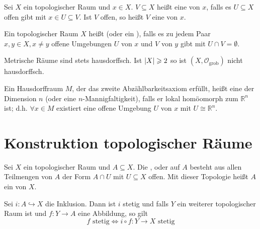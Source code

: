 \begin{definition}[{name=[Umgebung]}]
	Sei $X$ ein topologischer Raum und $x \in X$. 
	$V \subseteq X$ heißt eine  von $x$, falls es $U \subseteq X$ offen gibt mit $x \in U \subseteq V$. 
	Ist $V$ offen, so heißt $V$ eine  von $x$.
\end{definition}

\begin{definition}[{name=[Hausdorffraum]}]
	Ein topologischer Raum $X$ heißt  (oder ein ), falls es zu jedem Paar $x,y \in X, x \neq y$ offene Umgebungen $U$ von $x$ und $V$ von $y$ gibt mit $U \cap V = \emptyset$.
\end{definition}

Metrische Räume sind stets hausdorffsch.
Ist $\abs*{X} \ge 2 $ so ist $(X, \mathcal{O}_{\text{grob}})$ nicht hausdorffsch.

\begin{definition}[{name=[topologische Mannigfaltigkeit]}]
	Ein Hausdorffraum $M$, der das zweite Abzählbarkeitsaxiom erfüllt, heißt eine  der Dimension $n$ (oder eine $n$-Mannigfaltigkeit), falls er lokal homöomorph zum $\mathbb{R}^n$ ist; d.h. $\forall x \in M$ existiert eine offene Umgebung $U$ von $x$ mit $U \cong \mathbb{R}^n$.
\end{definition}

\newpage

\section{Konstruktion topologischer Räume} %
\label{sec:konst_topo}

\begin{definition}[{name=[Teilraumtopologie]}]
	Sei $X$ ein topologischer Raum und $A \subseteq X$.
	Die ,  oder  auf $A$ besteht aus allen Teilmengen von $A$ der Form $A \cap U$ mit $U \subseteq X$ offen. 
	Mit dieser Topologie heißt $A$ ein  von $X$.
\end{definition}

\begin{bemerkung}[{name=[Eigenschaften der Inklusion]}]
	Sei $i \colon A \hookrightarrow X$ die Inklusion.
	Dann ist $i$ stetig und falls $Y$ ein weiterer topologischer Raum ist und $f \colon Y \to A$ eine Abbildung, so gilt
	\[
		f \text{ stetig} \iff i \circ  f \colon Y \to X \text{ stetig}
	\]
\end{bemerkung}

